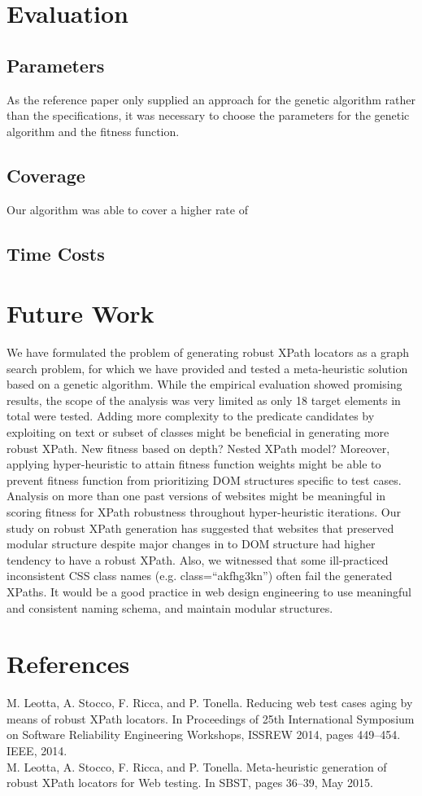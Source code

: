 \documentclass[format=acmlarge, nonacm=true]{acmart}
\begin{document}
\section{Evaluation}
\subsection{Parameters}
As the reference paper only supplied an approach for the genetic algorithm rather than the specifications, it was necessary to choose the parameters for the genetic algorithm and the fitness function. 

\subsection{Coverage}
Our algorithm was able to cover a higher rate of 


\subsection{Time Costs}



\section{Future Work}
We have formulated the problem of generating robust XPath locators as a graph search problem, for which we have provided and tested a meta-heuristic solution based on a genetic algorithm. While the empirical evaluation showed promising results, the scope of the analysis was very limited as only 18 target elements in total were tested. Adding more complexity to the predicate candidates by exploiting on text or subset of classes might be beneficial in generating more robust XPath. 
New fitness based on depth?
Nested XPath model?
Moreover, applying hyper-heuristic to attain fitness function weights might be able to prevent fitness function from prioritizing DOM structures specific to test cases. Analysis on more than one past versions of websites might be meaningful in scoring fitness for XPath robustness throughout hyper-heuristic iterations. 
Our study on robust XPath generation has suggested that websites that preserved modular structure despite major changes in to DOM structure had higher tendency to have a robust XPath. Also, we witnessed that some ill-practiced inconsistent CSS class names (e.g. class=“akfhg3kn”) often fail the generated XPaths. It would be a good practice in web design engineering to use meaningful and consistent naming schema, and maintain modular structures. 




\section*{References}

M. Leotta, A. Stocco, F. Ricca, and P. Tonella. Reducing web test cases aging by means of robust XPath locators. In Proceedings of 25th International Symposium on Software Reliability Engineering Workshops, ISSREW 2014, pages 449–454. IEEE, 2014.\\
M. Leotta, A. Stocco, F. Ricca, and P. Tonella. Meta-heuristic generation of robust XPath locators for Web testing. In SBST, pages 36–39, May 2015.
\end{document}

